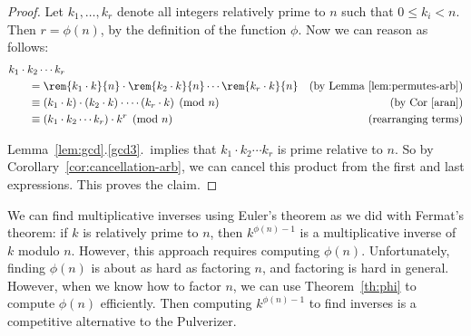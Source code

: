 \begin{proof}
Let $k_1, \dots, k_r$ denote all integers relatively prime to $n$
such that $0 \leq k_i < n$.  Then $r = \phi(n)$, by the definition of
the function $\phi$.  Now we can reason as follows:
%
\begin{align*}
\lefteqn{k_1 \cdot k_2 \cdots k_r} \hspace{0.25in} \\
& =
\rem{k_1 \cdot k}{n} \cdot 
\rem{k_2 \cdot k}{n} \cdots 
\rem{k_r \cdot k}{n} & \text{(by Lemma~\ref{lem:permutes-arb})}
\\
& \equiv 
(k_1 \cdot k) \cdot 
(k_2 \cdot k) \cdot 
\cdots 
(k_r \cdot k) \pmod{n} & \text{(by Cor~\ref{aran})}
\\
& \equiv  
(k_1 \cdot k_2 \cdots k_r) \cdot k^r \pmod{n} & \text{(rearranging terms)}
\end{align*}

Lemma~\ref{lem:gcd}.\ref{gcd3}.\ implies that $k_1 \cdot k_2
\cdots k_r$ is prime relative to $n$.  So by
Corollary~\ref{cor:cancellation-arb}, we can cancel this product from
the first and last expressions.  This proves the claim.
\end{proof}

We can find multiplicative inverses using Euler's theorem as we did
with Fermat's theorem: if $k$ is relatively prime to $n$, then
$k^{\phi(n) - 1}$ is a multiplicative inverse of $k$ modulo $n$.
However, this approach requires computing $\phi(n)$.  Unfortunately,
finding $\phi(n)$ is about as hard as factoring $n$, and factoring is
hard in general.  However, when we know how to factor $n$, we can use
Theorem~\ref{th:phi} to compute $\phi(n)$ efficiently.  Then computing
$k^{\phi(n) - 1}$ to find inverses is a competitive alternative to the
Pulverizer.

